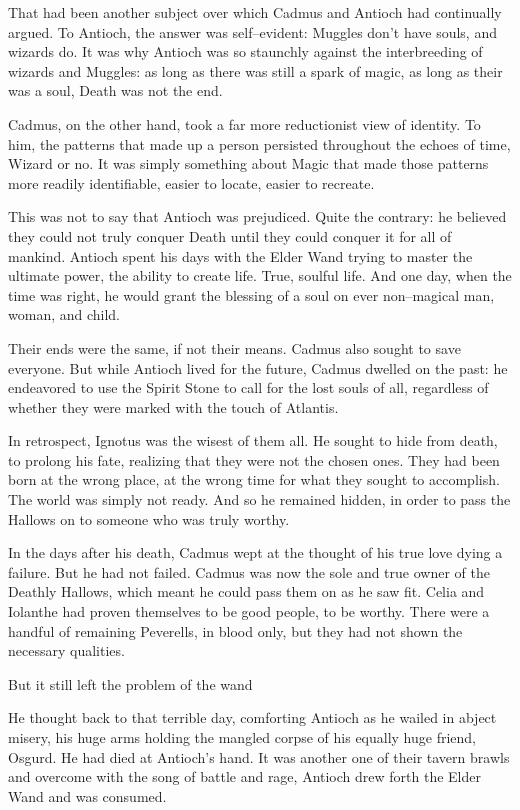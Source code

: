 That had been another subject over which Cadmus and Antioch had continually argued. To Antioch, the answer was self\mbox{--}evident: Muggles don’t have souls, and wizards do. It was why Antioch was so staunchly against the interbreeding of wizards and Muggles: as long as there was still a spark of magic, as long as their was a soul, Death was not the end.

Cadmus, on the other hand, took a far more reductionist view of identity. To him, the patterns that made up a person persisted throughout the echoes of time, Wizard or no. It was simply something about Magic that made those patterns more readily identifiable, easier to locate, easier to recreate.

This was not to say that Antioch was prejudiced. Quite the contrary: he believed they could not truly conquer Death until they could conquer it for all of mankind. Antioch spent his days with the Elder Wand trying to master the ultimate power, the ability to create life. True, soulful life. And one day, when the time was right, he would grant the blessing of a soul on ever non\mbox{--}magical man, woman, and child.

Their ends were the same, if not their means. Cadmus also sought to save everyone. But while Antioch lived for the future, Cadmus dwelled on the past: he endeavored to use the Spirit Stone to call for the lost souls of all, regardless of whether they were marked with the touch of Atlantis.

In retrospect, Ignotus was the wisest of them all. He sought to hide from death, to prolong his fate, realizing that they were not the chosen ones. They had been born at the wrong place, at the wrong time for what they sought to accomplish. The world was simply not ready. And so he remained hidden, in order to pass the Hallows on to someone who was truly worthy.

In the days after his death, Cadmus wept at the thought of his true love dying a failure. But he had not failed. Cadmus was now the sole and true owner of the Deathly Hallows, which meant he could pass them on as he saw fit. Celia and Iolanthe had proven themselves to be good people, to be worthy. There were a handful of remaining Peverells, in blood only, but they had not shown the necessary qualities.

But it still left the problem of the wand{\el}

He thought back to that terrible day, comforting Antioch as he wailed in abject misery, his huge arms holding the mangled corpse of his equally huge friend, Osgurd. He had died at Antioch’s hand. It was another one of their tavern brawls and overcome with the song of battle and rage, Antioch drew forth the Elder Wand and was consumed.

